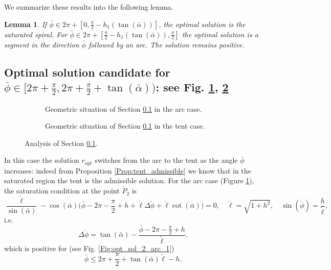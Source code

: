 \documentclass[reqno]{amsart}
\theoremstyle{definition} \newtheorem{definition}{Definition}[section]
\theoremstyle{definition} \newtheorem{remark}[definition]{Remark}
\theoremstyle{plain} \newtheorem{lemma}[definition]{Lemma}
\theoremstyle{plain} \newtheorem{proposition}[definition]{Proposition}
\theoremstyle{plain} \newtheorem{theorem}[definition]{Theorem}
\theoremstyle{plain} \newtheorem{corollary}[definition]{Corollary}
\theoremstyle{definition} \newtheorem{example}[definition]{Example}
\theoremstyle{plain} \newtheorem{claim}[clai]{Claim}
\theoremstyle{definition} \newtheorem{assumption}[definition]{Assumption}
\theoremstyle{definition} \newtheorem{observation}[definition]{Observation}
\newcommand{\1}{\mathbbm 1}
\numberwithin{equation}{section} %
\theoremstyle{plain} \newtheorem*{theorem*}{Theorem}
\theoremstyle{plain} \newtheorem{mthm}[maintheorem]{Main Theorem}
\theoremstyle{plain} \newtheorem*{mthm*}{Main Theorem}
\theoremstyle{plain} \newtheorem*{conjecture*}{Conjecture}
\theoremstyle{plain} \newtheorem{conjecture}[definition]{Conjecture}
\theoremstyle{plain} \newtheorem*{problem*}{Problem}
\begin{document}
We summarize these results into the following lemma.

\begin{lemma}
\label{Lem:optimal_2}
If $\bar \phi \in 2\pi + [0,\frac{\pi}{2} - h_1(\tan(\bar \alpha))]$, the optimal solution is the saturated spiral. For $\bar \phi \in 2\pi + [\frac{\pi}{2} - h_1(\tan(\bar \alpha)),\frac{\pi}{2}]$ the optimal solution is a segment in the direction $\bar \phi$ followed by an arc. The solution remains positive.
\end{lemma}


\subsection{Optimal solution candidate for \texorpdfstring{$\bar \phi \in [2\pi + \frac{\pi}{2},2\pi+\frac{\pi}{2}+\tan(\bar \alpha))$}{bar phi in [2pi + pi/2,2pi + pi/2+ tan(bar alpha)}: see Fig. \ref{Fig:opt_sol_2_1}, \ref{Fig:opt_sol_2_2}}
\label{Ss:optimal_cand_3}


\begin{figure}
\begin{subfigure}{.475\textwidth}
\resizebox{\textwidth}{!}{}
\caption{Geometric situation of Section \ref{Ss:optimal_cand_3} in the arc case.}
\label{Fig:opt_sol_2_1}
\end{subfigure} \hfill
\begin{subfigure}{.475\textwidth}
\resizebox{\textwidth}{!}{}
\caption{Geometric situation of Section \ref{Ss:optimal_cand_3} in the tent case.}
\label{Fig:opt_sol_2_2}
\end{subfigure}
\caption{Analysis of Section \ref{Ss:optimal_cand_3}.}
\label{Fig:opt_sol_2}
\end{figure}

In this case the solution $r_\mathrm{opt}$ switches from the arc to the tent as the angle $\bar \phi$ increases: indeed from Proposition \ref{Prop:tent_admissible} we know that in the saturated region the tent is the admissible solution. For the arc case (Figure \ref{Fig:opt_sol_2_1}), the saturation condition at the point $\check P_2$ is
\begin{equation*}
\frac{\check \ell}{\sin(\bar \alpha)} - \cos(\bar \alpha) \bigg( \bar \phi - 2\pi - \frac{\pi}{2} + h + \check \ell \Delta \check \phi + \check \ell \cot(\bar \alpha) \bigg) = 0, \quad \check \ell = \sqrt{1 + h^2}, \quad \sin(\check \phi) = \frac{h}{\check \ell},
\end{equation*}
i.e.
\begin{equation}
\label{Equa:opt_sol_2_arc_1}
\Delta \check \phi = \tan(\bar \alpha) - \frac{\bar \phi - 2\pi - \frac{\pi}{2} + h}{\check \ell}.
\end{equation}
which is positive for (see Fig. \ref{Fig:opt_sol_2_arc_1})
\begin{equation*}
\bar \phi \leq 2\pi + \frac{\pi}{2} + \tan(\bar \alpha) \check \ell - h.
\end{equation*}
\end{document}
